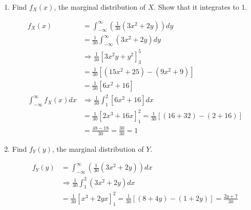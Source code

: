 \begin{enumerate}[label=(\alph*)]
        \item Find $f_{X}(x)$, the marginal distribution of $X$. Show that it integrates to 1.
        
        \begin{mdframed}
            \begin{align*}
                f_{X}(x)    & = \int_{-\infty}^{\infty}\left(\frac{1}{30}(3x^{2} + 2y)\right)dy                                 \\
                            & = \frac{1}{30}\int_{-\infty}^{\infty}(3x^2 + 2y)dy                                                \\
                            & \Rightarrow \frac{1}{30}\left[3x^{2}y + y^2\right]_{3}^{5}                                        \\
                            & = \frac{1}{30}\left[\left(15x^{2} + 25\right) - \left(9x^{2} + 9\right)\right]                    \\
                            & = \boxed{\frac{1}{30}\left[6x^2 + 16\right]}                                                      \\
                \int_{-\infty}^{\infty}f_{X}(x)dx & \Rightarrow \frac{1}{30}\int_{1}^{2}\left[6x^2 + 16\right]dx                \\
                            & = \frac{1}{30}\left[2x^{3} + 16x\right]_{1}^{2} = \frac{1}{30}\left[(16 + 32) - (2 + 16)\right]   \\
                            & = \frac{48 - 18}{30} = \frac{30}{30} = 1
            \end{align*}
        \end{mdframed}

        \item Find $f_{Y}(y)$, the marginal distribution of $Y$.
        
        \begin{mdframed}
            \begin{align*}
                f_{Y}(y)    & = \int_{-\infty}^{\infty}\left(\frac{1}{30}(3x^{2} + 2y)\right)dx                                 \\
                            & \Rightarrow \frac{1}{30}\int_{1}^{2}(3x^{2}+2y)dx                                                 \\
                            & = \frac{1}{30}\left[x^{3}+2yx\right]_{1}^{2} = \frac{1}{30}\left[(8 + 4y) - (1 + 2y)\right] = \boxed{\frac{2y + 7}{30}}
            \end{align*}
        \end{mdframed}
    \end{enumerate}


